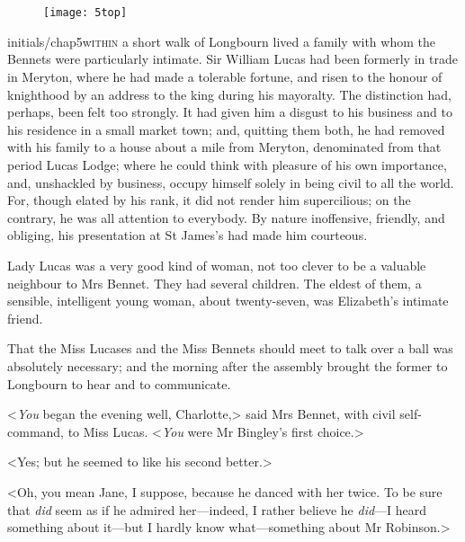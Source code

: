 
\chapter[Chapter \thechapter]{}
\begin{figure}[t!]
\centering
\texttt{[image: 5top]}
\end{figure}

\lettrine[lines=6,image=true]{initials/chap5w}{ithin}  a short walk of Longbourn lived a family with whom the Bennets were particularly intimate. Sir William Lucas had been formerly in trade in Meryton, where he had made a tolerable fortune, and risen to the honour of knighthood by an address to the king during his mayoralty. The distinction had, perhaps, been felt too strongly. It had given him a disgust to his business and to his residence in a small market town; and, quitting them both, he had removed with his family to a house about a mile from Meryton, denominated from that period Lucas Lodge; where he could think with pleasure of his own importance, and, unshackled by business, occupy himself solely in being civil to all the world. For, though elated by his rank, it did not render him supercilious; on the contrary, he was all attention to everybody. By nature inoffensive, friendly, and obliging, his presentation at St James's had made him courteous.

Lady Lucas was a very good kind of woman, not too clever to be a valuable neighbour to Mrs Bennet. They had several children. The eldest of them, a sensible, intelligent young woman, about twenty-seven, was Elizabeth's intimate friend.

That the Miss Lucases and the Miss Bennets should meet to talk over a ball was absolutely necessary; and the morning after the assembly brought the former to Longbourn to hear and to communicate.

<\textit{You} began the evening well, Charlotte,> said Mrs Bennet, with civil self-command, to Miss Lucas. <\textit{You} were Mr Bingley's first choice.>

<Yes; but he seemed to like his second better.>

<Oh, you mean Jane, I suppose, because he danced with her twice. To be sure that \textit{did} seem as if he admired her—indeed, I rather believe he \textit{did}—I heard something about it—but I hardly know what—something about Mr Robinson.>


